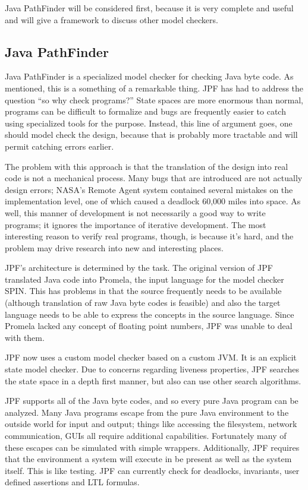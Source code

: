 \documentclass{article}
\begin{document}
\begin{multicols}{2}
Java PathFinder will be considered first, because it is very complete
and useful and will give a framework to discuss other model checkers.

\subsection{Java PathFinder\cite{786967}}

Java PathFinder is a specialized model checker for checking Java byte
code.  As mentioned, this is a something of a remarkable thing.  JPF
has had to address the question ``so why check programs?''  State
spaces are more enormous than normal, programs can be difficult to
formalize and bugs are frequently easier to catch using specialized
tools for the purpose.  Instead, this line of argument goes, one
should model check the design, because that is probably more tractable
and will permit catching errors earlier.

The problem with this approach is that the translation of the design
into real code is not a mechanical process.  Many bugs that are
introduced are not actually design errors; NASA's Remote Agent system
contained several mistakes on the implementation level, one of which
caused a deadlock 60,000 miles into space.  As well, this manner of
development is not necessarily a good way to write programs; it
ignores the importance of iterative development.  The most interesting
reason to verify real programs, though, is because it's hard, and the
problem may drive research into new and interesting places.

JPF's architecture is determined by the task.  The original version of
JPF translated Java code into Promela, the input language for the
model checker SPIN.  This has problems in that the source frequently
needs to be available (although translation of raw Java byte codes is
feasible) and also the target language needs to be able to express the
concepts in the source language.  Since Promela lacked any concept of
floating point numbers, JPF was unable to deal with them.

JPF now uses a custom model checker based on a custom JVM.  It is an
explicit state model checker.  Due to concerns regarding liveness
properties, JPF searches the state space in a depth first manner, but
also can use other search algorithms.

JPF supports all of the Java byte codes, and so every pure Java
program can be analyzed.  Many Java programs escape from the pure Java
environment to the outside world for input and output; things like
accessing the filesystem, network communication, GUIs all require
additional capabilities.  Fortunately many of these escapes can be
simulated with simple wrappers.  Additionally, JPF requires that the
environment a system will execute in be present as well as the system
itself.  This is like testing.  JPF can currently check for deadlocks,
invariants, user defined assertions and LTL formulas.


\end{multicols}
\end{document}
